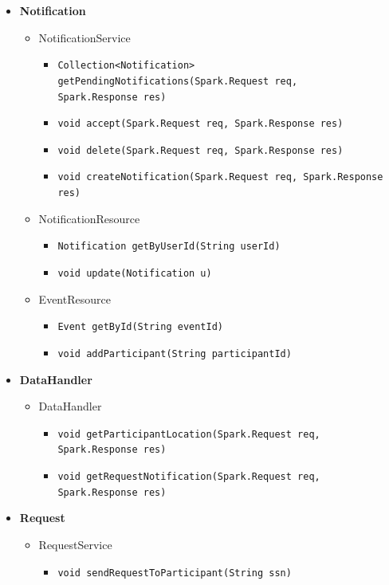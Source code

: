 \documentclass[a4paper, hidelinks, 12pt]{report}
\begin{document}
\begin{itemize}
		\item{\textbf{Notification}}
			\begin{itemize}
				\item{NotificationService}
					\begin{itemize}
						\item{\verb|Collection<Notification> getPendingNotifications(Spark.Request req,|\\ \verb|Spark.Response res)|}
						\item{\verb|void accept(Spark.Request req, Spark.Response res)|}
						\item{\verb|void delete(Spark.Request req, Spark.Response res)|}
						\item{\verb|void createNotification(Spark.Request req, Spark.Response res)|}
					\end{itemize}
				\item{NotificationResource}
					\begin{itemize}
						\item{\verb|Notification getByUserId(String userId)|}
						\item{\verb|void update(Notification u)|}
					\end{itemize}
				\item{EventResource}
					\begin{itemize}
						\item{\verb|Event getById(String eventId)|}
						\item{\verb|void addParticipant(String participantId)|}
					\end{itemize}
			\end{itemize}
		\item{\textbf{DataHandler}}
			\begin{itemize}
				\item{DataHandler}
					\begin{itemize}
						\item{\verb|void getParticipantLocation(Spark.Request req, Spark.Response res)|}
						\item{\verb|void getRequestNotification(Spark.Request req, Spark.Response res)|}
					\end{itemize}
			\end{itemize}
		\item{\textbf{Request}}
			\begin{itemize}
				\item{RequestService}
					\begin{itemize}
						\item{\verb|void sendRequestToParticipant(String ssn)|}

\end{itemize}
\end{itemize}
\end{itemize}
\end{document}
